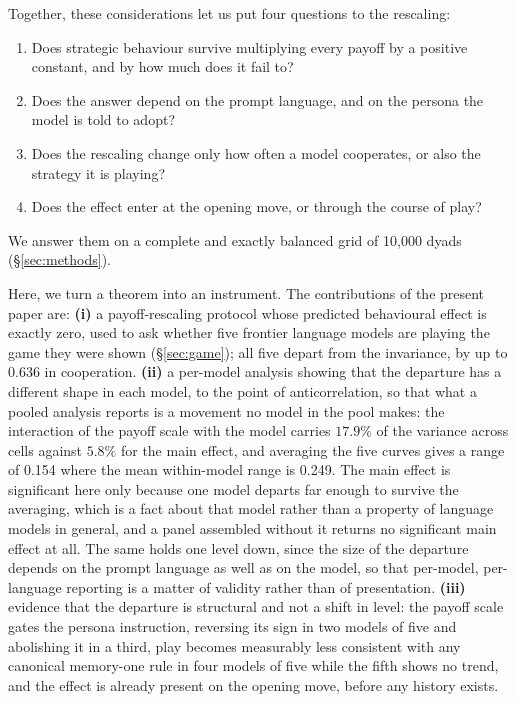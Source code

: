 \documentclass[11pt,a4paper]{article}
\begin{document}
Together, these considerations let us put four questions to the rescaling:
\begin{enumerate}[(1)]
\item Does strategic behaviour survive multiplying every payoff by a positive
      constant, and by how much does it fail to?
\item Does the answer depend on the prompt language, and on the persona the
      model is told to adopt?
\item Does the rescaling change only how often a model cooperates, or also the
      strategy it is playing?
\item Does the effect enter at the opening move, or through the course of play?
\end{enumerate}
We answer them on a complete and exactly balanced grid of 10{,}000 dyads
(\S\ref{sec:methods}).

Here, we turn a theorem into an instrument. The contributions of the present
paper are: \textbf{(i)} a payoff-rescaling protocol whose predicted behavioural
effect is exactly zero, used to ask whether five frontier language models are
playing the game they were shown (\S\ref{sec:game}); all five depart from the
invariance, by up to 0.636 in cooperation. \textbf{(ii)} a per-model analysis
showing that the departure has a different shape in each model, to the point of
anticorrelation, so that what a pooled analysis reports is a movement no model
in the pool makes: the interaction of the payoff scale with the model carries
$17.9\%$ of the variance across cells against $5.8\%$ for the main effect, and
averaging the five curves gives a range of 0.154 where the mean within-model
range is 0.249. The main effect is significant here only because one model
departs far enough to survive the averaging, which is a fact about that model
rather than a property of language models in general, and a panel assembled
without it returns no significant main effect at all. The same holds one level
down, since the size of the departure depends on the prompt language as well as
on the model, so that per-model, per-language reporting is a matter of validity
rather than of presentation. \textbf{(iii)} evidence that the departure is
structural and not a shift in level: the payoff scale gates the persona
instruction, reversing its sign in two models of five and abolishing it in a
third, play becomes measurably less consistent with any canonical memory-one
rule in four models of five while the fifth shows no trend, and the effect is
already present on the opening move, before any history exists.
\end{document}
